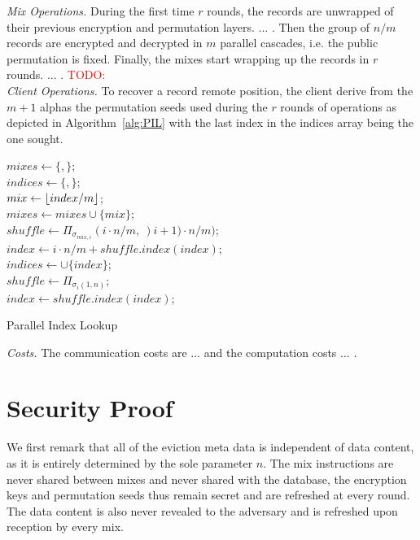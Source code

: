 \documentclass[USenglish,oneside,twocolumn]{article}
\DeclarePairedDelimiter\floor{\lfloor}{\rfloor}
\newcommand{\todo}[1]{\textcolor{red}{TODO: #1}}
\begin{document}
\noindent\textit{Mix Operations.} During the first time $r$ rounds, the records are unwrapped of their previous encryption and permutation layers. ... . Then the group of $n/m$ records are encrypted and decrypted in $m$ parallel cascades, i.e. the public permutation is fixed. Finally, the mixes start wrapping up the records in $r$ rounds. ... . \todo{} \\

\noindent\textit{Client Operations.} To recover a record remote position, the client derive from the $m+1$ alphas the permutation seeds used during the $r$ rounds of operations as depicted in Algorithm~\ref{alg:PIL} with the last index in the indices array being the one sought.\\

\begin{algorithm}
\DontPrintSemicolon
{}
$mixes \gets \{,\}$;\\
$indices \gets \{,\}$;\\
{
	$mix \gets \floor{index/m}$;\\
	$mixes \gets mixes \cup \{mix \}$;\\
	$shuffle \gets {\Pi}_{\sigma_{mix,i}}(i\cdot n / m,\ )i+1)\cdot n / m)$;\\
	$index \gets i\cdot n/m + shuffle.index(index)$;\\
	$indices \gets \cup \{index\}$;\\
	$shuffle \gets {\Pi}_{\sigma_{i}(1,n)}$;\\
	$index \gets shuffle.index(index)$;\\
}
\caption{Parallel Index Lookup}
\label{alg:PIL}
\end{algorithm}

\noindent\textit{Costs.} The communication costs are ... and the computation costs ... .\\

\section{Security Proof}\label{Security}

We first remark that all of the eviction meta data is independent of data content, as it is entirely determined by the sole parameter $n$. The mix instructions are never shared between mixes and never shared with the database, the encryption keys and permutation seeds thus remain secret and are refreshed at every round. The data content is also never revealed to the adversary and is refreshed upon reception by every mix.
\end{document}
